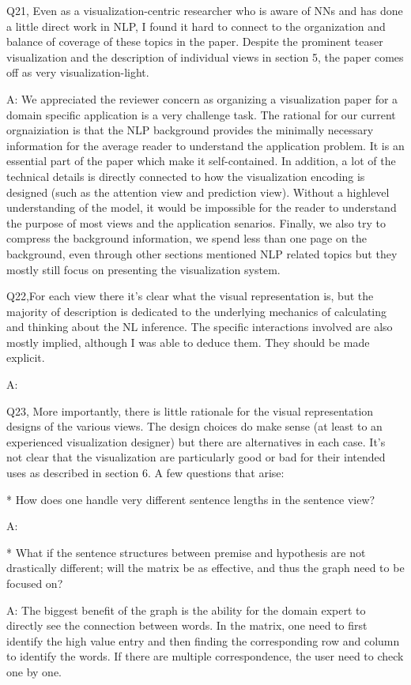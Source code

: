 Q21, Even as a visualization-centric researcher who is aware of NNs and has done a little direct work in NLP, I found it hard to connect to the organization and balance of coverage of these topics in the paper. Despite the prominent teaser visualization and the description of individual views in section 5, the paper comes off as very visualization-light.

A: We appreciated the reviewer concern as organizing a visualization paper for a domain specific application is a very challenge task. The rational for our current orgnaiziation is that the NLP background provides the minimally necessary information for the average reader to understand the application problem. It is an essential part of the paper which make it self-contained. In addition, a lot of the technical details is directly connected to how the visualization encoding is designed (such as the attention view and prediction view). Without a highlevel understanding of the model, it would be impossible for the reader to understand the purpose of most views and the application senarios. Finally, we also try to compress the background information, we spend less than one page on the background, even through other sections mentioned NLP related topics but they mostly still focus on presenting the visualization system.


Q22,For each view there it's clear what the visual representation is, but the majority of description is dedicated to the underlying mechanics of calculating and thinking about the NL inference. The specific interactions involved are also mostly implied, although I was able to deduce them. They should be made explicit.

A:

Q23, More importantly, there is little rationale for the visual representation designs of the various views. The design choices do make sense (at least to an experienced visualization designer) but there are alternatives in each case. It's not clear that the visualization are particularly good or bad for their intended uses as described in section 6. A few questions that arise:

* How does one handle very different sentence lengths in the sentence view?

A:

* What if the sentence structures between premise and hypothesis are not drastically different; will the matrix be as effective, and thus the graph need to be focused on?

A: The biggest benefit of the graph is the ability for the domain expert to directly see the connection between words. In the matrix, one need to first identify the high value entry and then finding the corresponding row and column to identify the words. If there are multiple correspondence, the user need to check one by one.


